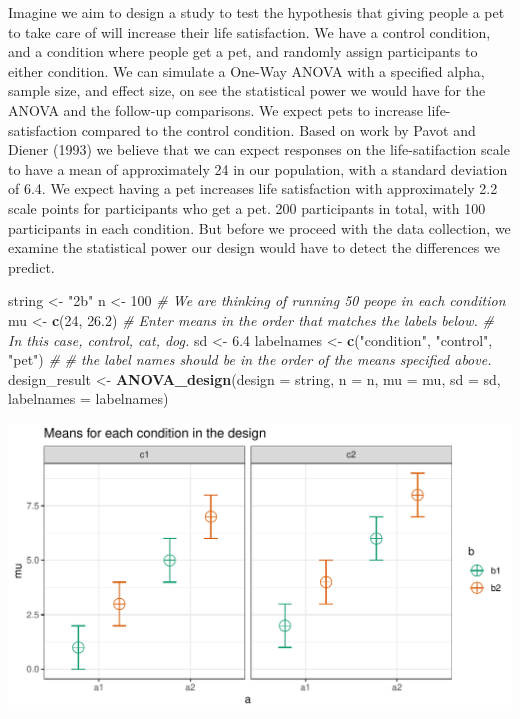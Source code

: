 \documentclass[]{book}
\newenvironment{Shaded}{\begin{snugshade}}{\end{snugshade}}
\newcommand{\CommentTok}[1]{\textcolor[rgb]{0.56,0.35,0.01}{\textit{#1}}}
\newcommand{\DataTypeTok}[1]{\textcolor[rgb]{0.13,0.29,0.53}{#1}}
\newcommand{\DecValTok}[1]{\textcolor[rgb]{0.00,0.00,0.81}{#1}}
\newcommand{\FloatTok}[1]{\textcolor[rgb]{0.00,0.00,0.81}{#1}}
\newcommand{\KeywordTok}[1]{\textcolor[rgb]{0.13,0.29,0.53}{\textbf{#1}}}
\newcommand{\NormalTok}[1]{#1}
\newcommand{\StringTok}[1]{\textcolor[rgb]{0.31,0.60,0.02}{#1}}
\begin{document}
Imagine we aim to design a study to test the hypothesis that giving people a pet to take care of will increase their life satisfaction. We have a control condition, and a condition where people get a pet, and randomly assign participants to either condition. We can simulate a One-Way ANOVA with a specified alpha, sample size, and effect size, on see the statistical power we would have for the ANOVA and the follow-up comparisons. We expect pets to increase life-satisfaction compared to the control condition. Based on work by Pavot and Diener (1993) we believe that we can expect responses on the life-satifaction scale to have a mean of approximately 24 in our population, with a standard deviation of 6.4. We expect having a pet increases life satisfaction with approximately 2.2 scale points for participants who get a pet. 200 participants in total, with 100 participants in each condition. But before we proceed with the data collection, we examine the statistical power our design would have to detect the differences we predict.

\begin{Shaded}
\begin{Highlighting}[]
\NormalTok{string <-}\StringTok{ "2b"}
\NormalTok{n <-}\StringTok{ }\DecValTok{100}
\CommentTok{# We are thinking of running 50 peope in each condition}
\NormalTok{mu <-}\StringTok{ }\KeywordTok{c}\NormalTok{(}\DecValTok{24}\NormalTok{, }\FloatTok{26.2}\NormalTok{)}
\CommentTok{# Enter means in the order that matches the labels below.}
\CommentTok{# In this case, control, cat, dog. }
\NormalTok{sd <-}\StringTok{ }\FloatTok{6.4}
\NormalTok{labelnames <-}\StringTok{ }\KeywordTok{c}\NormalTok{(}\StringTok{"condition"}\NormalTok{, }\StringTok{"control"}\NormalTok{, }\StringTok{"pet"}\NormalTok{) }\CommentTok{#}
\CommentTok{# the label names should be in the order of the means specified above.}
\NormalTok{design_result <-}\StringTok{ }\KeywordTok{ANOVA_design}\NormalTok{(}\DataTypeTok{design =}\NormalTok{ string,}
                   \DataTypeTok{n =}\NormalTok{ n, }
                   \DataTypeTok{mu =}\NormalTok{ mu, }
                   \DataTypeTok{sd =}\NormalTok{ sd, }
                   \DataTypeTok{labelnames =}\NormalTok{ labelnames)}
\end{Highlighting}
\end{Shaded}

\includegraphics{SuperpowerValidation_files/figure-latex/unnamed-chunk-2-1.pdf}
\end{document}
